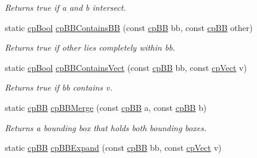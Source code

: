 \begin{DoxyCompactItemize}
\begin{DoxyCompactList}\small\item\em Returns true if {\ttfamily a} and {\ttfamily b} intersect. \end{DoxyCompactList}\item 
\hypertarget{group__cp_b_b_b_gae0f2d67ca77b4b510c1a9c3a744627ba}{}static \hyperlink{group__basic_types_gabc5e752c48f3449ca26ef413ecbd647e}{cp\+Bool} \hyperlink{group__cp_b_b_b_gae0f2d67ca77b4b510c1a9c3a744627ba}{cp\+B\+B\+Contains\+B\+B} (const \hyperlink{structcp_b_b}{cp\+B\+B} bb, const \hyperlink{structcp_b_b}{cp\+B\+B} other)\label{group__cp_b_b_b_gae0f2d67ca77b4b510c1a9c3a744627ba}

\begin{DoxyCompactList}\small\item\em Returns true if {\ttfamily other} lies completely within {\ttfamily bb}. \end{DoxyCompactList}\item 
\hypertarget{group__cp_b_b_b_gaee3aab91cca0adbe8c830cac0951da6a}{}static \hyperlink{group__basic_types_gabc5e752c48f3449ca26ef413ecbd647e}{cp\+Bool} \hyperlink{group__cp_b_b_b_gaee3aab91cca0adbe8c830cac0951da6a}{cp\+B\+B\+Contains\+Vect} (const \hyperlink{structcp_b_b}{cp\+B\+B} bb, const \hyperlink{structcp_vect}{cp\+Vect} v)\label{group__cp_b_b_b_gaee3aab91cca0adbe8c830cac0951da6a}

\begin{DoxyCompactList}\small\item\em Returns true if {\ttfamily bb} contains {\ttfamily v}. \end{DoxyCompactList}\item 
\hypertarget{group__cp_b_b_b_gacde4506e27649bb6773009c337266d0d}{}static \hyperlink{structcp_b_b}{cp\+B\+B} \hyperlink{group__cp_b_b_b_gacde4506e27649bb6773009c337266d0d}{cp\+B\+B\+Merge} (const \hyperlink{structcp_b_b}{cp\+B\+B} a, const \hyperlink{structcp_b_b}{cp\+B\+B} b)\label{group__cp_b_b_b_gacde4506e27649bb6773009c337266d0d}

\begin{DoxyCompactList}\small\item\em Returns a bounding box that holds both bounding boxes. \end{DoxyCompactList}\item 
\hypertarget{group__cp_b_b_b_gad995b2feaa55d6bc858e8f930a4ed325}{}static \hyperlink{structcp_b_b}{cp\+B\+B} \hyperlink{group__cp_b_b_b_gad995b2feaa55d6bc858e8f930a4ed325}{cp\+B\+B\+Expand} (const \hyperlink{structcp_b_b}{cp\+B\+B} bb, const \hyperlink{structcp_vect}{cp\+Vect} v)\label{group__cp_b_b_b_gad995b2feaa55d6bc858e8f930a4ed325}


\end{DoxyCompactItemize}
